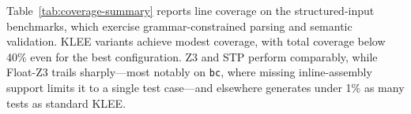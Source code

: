 \documentclass[acmsmall]{acmart}
\newcommand{\projName}{\textsc{Gordian}\xspace}
\theoremstyle{definition}
\begin{document}



Table~\ref{tab:coverage-summary} reports line coverage on the structured-input benchmarks, which exercise grammar-constrained parsing and semantic validation. KLEE variants achieve modest coverage, with total coverage below 40\% even for the best configuration. Z3 and STP perform comparably, while Float-Z3 trails sharply---most notably on \texttt{bc}, where missing inline-assembly support limits it to a single test case---and elsewhere generates under 1\% as many tests as standard KLEE.
\end{document}
